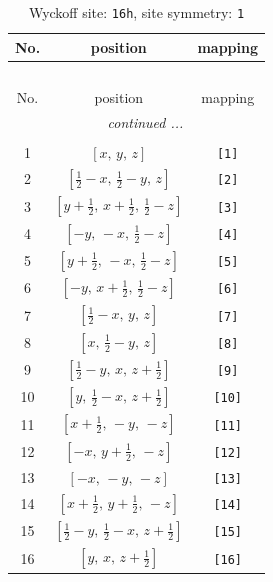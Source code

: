 \documentclass[fleqn,8pt]{jsarticle}
\begin{document}
\begin{longtable}{ccc}
\caption{Wyckoff site: {\tt 16h}, site symmetry: {\tt 1}}
 \\
 \hline \hline
No. & position & mapping \\ \hline \endfirsthead

\multicolumn{2}{l}{\tablename\ \thetable{}} \\
 \hline \hline
No. & position & mapping \\ \hline \endhead

 \hline \hline
\multicolumn{2}{r}{\footnotesize\it continued ...} \\ \endfoot

 \hline \hline
\multicolumn{2}{r}{} \\ \endlastfoot

1 & $\left[ x,\, y,\, z \right]$ & {\tt [1]} \\ \hline
2 & $\left[ \frac{1}{2} - x,\, \frac{1}{2} - y,\, z \right]$ & {\tt [2]} \\ \hline
3 & $\left[ y + \frac{1}{2},\, x + \frac{1}{2},\, \frac{1}{2} - z \right]$ & {\tt [3]} \\ \hline
4 & $\left[ - y,\, - x,\, \frac{1}{2} - z \right]$ & {\tt [4]} \\ \hline
5 & $\left[ y + \frac{1}{2},\, - x,\, \frac{1}{2} - z \right]$ & {\tt [5]} \\ \hline
6 & $\left[ - y,\, x + \frac{1}{2},\, \frac{1}{2} - z \right]$ & {\tt [6]} \\ \hline
7 & $\left[ \frac{1}{2} - x,\, y,\, z \right]$ & {\tt [7]} \\ \hline
8 & $\left[ x,\, \frac{1}{2} - y,\, z \right]$ & {\tt [8]} \\ \hline
9 & $\left[ \frac{1}{2} - y,\, x,\, z + \frac{1}{2} \right]$ & {\tt [9]} \\ \hline
10 & $\left[ y,\, \frac{1}{2} - x,\, z + \frac{1}{2} \right]$ & {\tt [10]} \\ \hline
11 & $\left[ x + \frac{1}{2},\, - y,\, - z \right]$ & {\tt [11]} \\ \hline
12 & $\left[ - x,\, y + \frac{1}{2},\, - z \right]$ & {\tt [12]} \\ \hline
13 & $\left[ - x,\, - y,\, - z \right]$ & {\tt [13]} \\ \hline
14 & $\left[ x + \frac{1}{2},\, y + \frac{1}{2},\, - z \right]$ & {\tt [14]} \\ \hline
15 & $\left[ \frac{1}{2} - y,\, \frac{1}{2} - x,\, z + \frac{1}{2} \right]$ & {\tt [15]} \\ \hline
16 & $\left[ y,\, x,\, z + \frac{1}{2} \right]$ & {\tt [16]} \\
\end{longtable}
\end{document}
